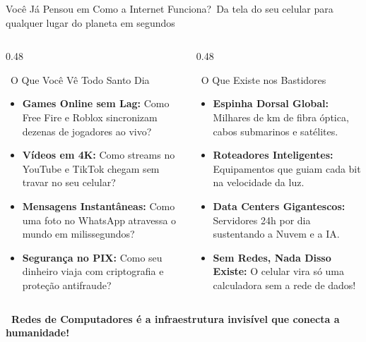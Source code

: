 
\begin{frame}{Você Já Pensou em Como a Internet Funciona?}{\faWifi\ Da tela do seu celular para qualquer lugar do planeta em segundos}
  \begin{columns}[t]
    \begin{column}{0.48\textwidth}
      \begin{bluecard}{\faMobile\ O Que Você Vê Todo Santo Dia}
        \scriptsize
        \begin{itemize}\setlength{\itemsep}{0.18em}
          \item \textbf{Games Online sem Lag:} Como Free Fire e Roblox sincronizam dezenas de jogadores ao vivo?
          \item \textbf{Vídeos em 4K:} Como streams no YouTube e TikTok chegam sem travar no seu celular?
          \item \textbf{Mensagens Instantâneas:} Como uma foto no WhatsApp atravessa o mundo em milissegundos?
          \item \textbf{Segurança no PIX:} Como seu dinheiro viaja com criptografia e proteção antifraude?
        \end{itemize}
      \end{bluecard}
    \end{column}
    
    \begin{column}{0.48\textwidth}
      \begin{greencard}{\faProjectDiagram\ O Que Existe nos Bastidores}
        \scriptsize
        \begin{itemize}\setlength{\itemsep}{0.18em}
          \item \textbf{Espinha Dorsal Global:} Milhares de km de fibra óptica, cabos submarinos e satélites.
          \item \textbf{Roteadores Inteligentes:} Equipamentos que guiam cada bit na velocidade da luz.
          \item \textbf{Data Centers Gigantescos:} Servidores 24h por dia sustentando a Nuvem e a IA.
          \item \textbf{Sem Redes, Nada Disso Existe:} O celular vira só uma calculadora sem a rede de dados!
        \end{itemize}
      \end{greencard}
    \end{column}
  \end{columns}
  
  \vspace{0.1cm}
  \begin{center}
    \scriptsize \textcolor{IFCEDarkGreen}{\textbf{\faGlobe\ Redes de Computadores é a infraestrutura invisível que conecta a humanidade!}}
  \end{center}
\end{frame}

